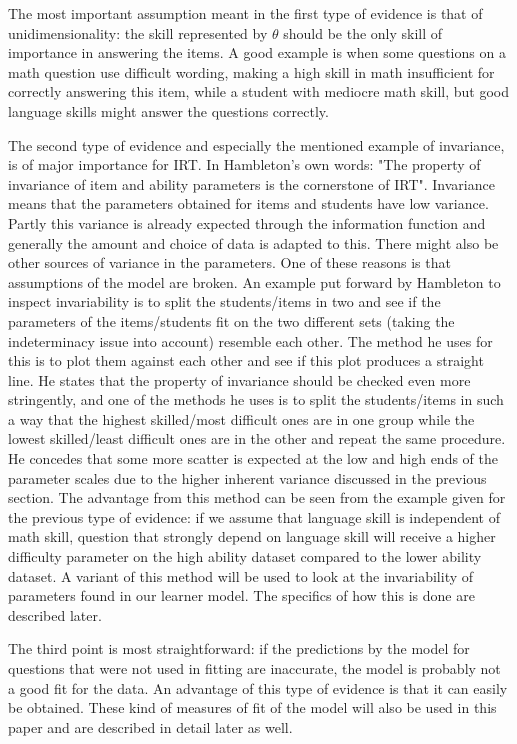 \documentclass{scrartcl}
\begin{document}
 The most important assumption meant in the first type of evidence is that of unidimensionality: the skill represented by $\theta$ should be the only skill of importance in answering the items. A good example is when some questions on a math question use difficult wording, making a high skill in math insufficient for correctly answering this item, while a student with mediocre math skill, but good language skills might answer the questions correctly. 

The second type of evidence and especially the mentioned example of invariance, is of major importance for IRT. In Hambleton's own words: "The property of invariance of item and ability parameters is the cornerstone of IRT". Invariance means that the parameters obtained for items and students have low variance. Partly this variance is already expected through the information function and generally the amount and choice of data is adapted to this. There might also be other sources of variance in the parameters. One of these reasons is that assumptions of the model are broken. An example put forward by Hambleton to inspect invariability is to split the students/items in two and see if the parameters of the items/students fit on the two different sets (taking the indeterminacy issue into account) resemble each other. The method he uses for this is to plot them against each other and see if this plot produces a straight line. He states that the property of invariance should be checked even more stringently, and one of the methods he uses is to split the students/items in such a way that the highest skilled/most difficult ones are in one group while the lowest skilled/least difficult ones are in the other and repeat the same procedure. He concedes that some more scatter is expected at the low and high ends of the parameter scales due to the higher inherent variance discussed in the previous section. The advantage from this method can be seen from the example given for the previous type of evidence: if we assume that language skill is independent of math skill, question that strongly depend on language skill will receive a higher difficulty parameter on the high ability dataset compared to the lower ability dataset. A variant of this method will be used to look at the invariability of parameters found in our learner model. The specifics of how this is done are described later. 

The third point is most straightforward: if the predictions by the model for questions that were not used in fitting are inaccurate, the model is probably not a good fit for the data. An advantage of this type of evidence is that it can easily be obtained. These kind of measures of fit of the model will also be used in this paper and are described in detail later as well. 
\end{document}
